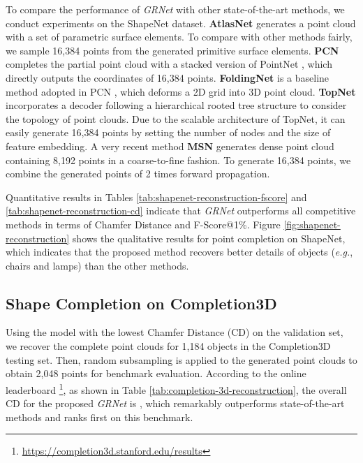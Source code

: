 \documentclass[runningheads]{llncs}
\begin{document}
To compare the performance of {\it GRNet} with other state-of-the-art methods, we conduct experiments on the ShapeNet dataset.
\textbf{AtlasNet} \cite{DBLP:conf/cvpr/GroueixFKRA18} generates a point cloud with a set of parametric surface elements.
To compare with other methods fairly, we sample 16,384 points from the generated primitive surface elements.
\textbf{PCN} \cite{DBLP:conf/ThreeDim/YuanKHMH18} completes the partial point cloud with a stacked version of PointNet \cite{DBLP:conf/cvpr/QiSMG17}, which directly outputs the coordinates of 16,384 points.
\textbf{FoldingNet} \cite{DBLP:conf/cvpr/YangFST18} is a baseline method adopted in PCN \cite{DBLP:conf/ThreeDim/YuanKHMH18}, which deforms a  2D grid into 3D point cloud.
\textbf{TopNet} \cite{DBLP:conf/cvpr/TchapmiKR0S19} incorporates a decoder following a hierarchical rooted tree structure to consider the topology of point clouds.
Due to the scalable architecture of TopNet, it can easily generate 16,384 points by setting the number of nodes and the size of feature embedding.
A very recent method \textbf{MSN} \cite{DBLP:conf/aaai/LiuSYSH20} generates dense point cloud containing 8,192 points in a coarse-to-fine fashion.
To generate 16,384 points, we combine the generated points of 2 times forward propagation.

Quantitative results in Tables \ref{tab:shapenet-reconstruction-fscore} and \ref{tab:shapenet-reconstruction-cd} indicate that {\it GRNet} outperforms all competitive methods in terms of Chamfer Distance and F-Score@1\%.
Figure \ref{fig:shapenet-reconstruction} shows the qualitative results for point completion on ShapeNet, which indicates that the proposed method recovers better details of objects ({\it e.g.}, chairs and lamps) than the other methods.

\subsection{Shape Completion on Completion3D}

Using the model with the lowest Chamfer Distance (CD) on the validation set, we recover the complete point clouds for 1,184 objects in the Completion3D testing set.
Then, random subsampling is applied to the generated point clouds to obtain 2,048 points for benchmark evaluation. 
According to the online leaderboard \footnote{\url{https://completion3d.stanford.edu/results}}, as shown in Table \ref{tab:completion-3d-reconstruction}, the overall CD for the proposed {\it GRNet} is , which remarkably outperforms state-of-the-art methods and ranks first on this benchmark.
\end{document}
